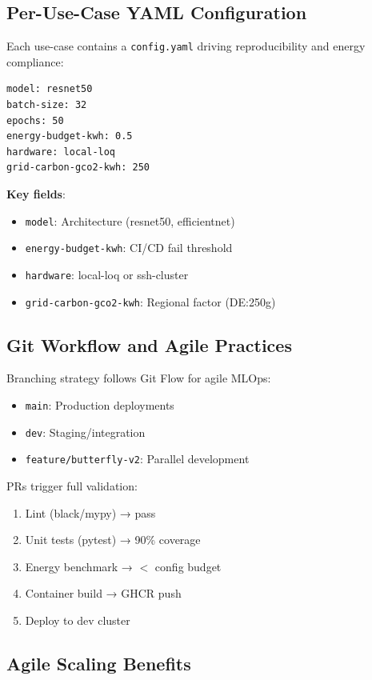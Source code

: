 \subsection{Per-Use-Case YAML Configuration}

Each use-case contains a \texttt{config.yaml} driving reproducibility and energy compliance:

\begin{verbatim}
model: resnet50
batch-size: 32
epochs: 50
energy-budget-kwh: 0.5
hardware: local-loq
grid-carbon-gco2-kwh: 250
\end{verbatim}

\textbf{Key fields}:
\begin{itemize}
    \item \texttt{model}: Architecture (resnet50, efficientnet)
    \item \texttt{energy-budget-kwh}: CI/CD fail threshold
    \item \texttt{hardware}: local-loq or ssh-cluster
    \item \texttt{grid-carbon-gco2-kwh}: Regional factor (DE:\@ 250g)
\end{itemize}

\subsection{Git Workflow and Agile Practices}

Branching strategy follows Git Flow for agile MLOps:

\begin{itemize}
    \item \texttt{main}: Production deployments
    \item \texttt{dev}: Staging/integration
    \item \texttt{feature/butterfly-v2}: Parallel development
\end{itemize}

PRs trigger full validation:
\begin{enumerate}
    \item Lint (black/mypy) → pass
    \item Unit tests (pytest) → 90\% coverage
    \item Energy benchmark → $<$ config budget
    \item Container build → GHCR push
    \item Deploy to dev cluster
\end{enumerate}

\subsection{Agile Scaling Benefits}

